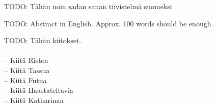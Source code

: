 \documentclass[english,12pt,a4paper,pdftex]{article}
\begin{document}


\makecoverpage


\begin{abstractpage}[finnish]
    TODO: Tähän noin sadan sanan tiivistelmä suomeksi
\end{abstractpage}

\newpage
%
\begin{abstractpage}[english]
  TODO: Abstract in English. Approx. 100 words should be enough.
\end{abstractpage}

TODO: Tähän kiitokset. \\
\\ -- Kiitä Ristoa
\\ -- Kiitä Tassua
\\ -- Kiitä Futua
\\ -- Kiitä Haastateltavia
\\ -- Kiitä Katharinaa
\end{document}
